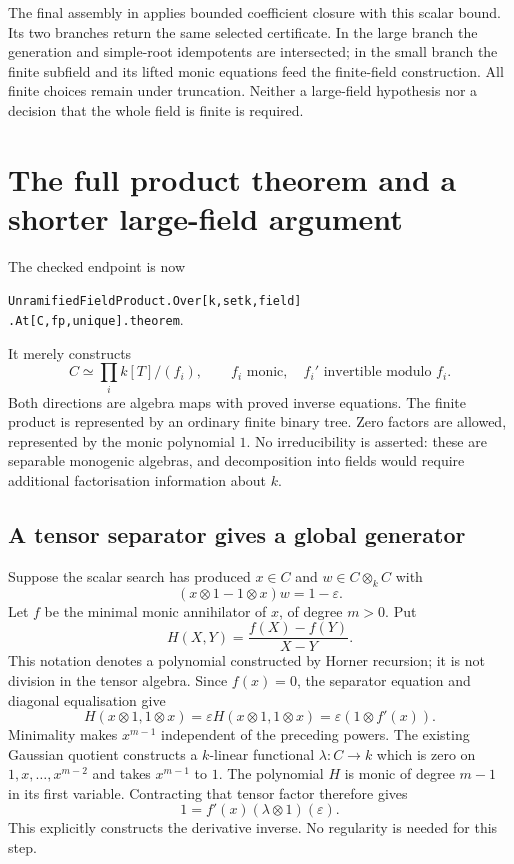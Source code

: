 \documentclass[11pt]{article}
\begin{document}
The final assembly in  applies
bounded coefficient closure with this scalar bound. Its two branches
return the same selected certificate. In the large branch the
generation and simple-root idempotents are intersected; in the small
branch the finite subfield and its lifted monic equations feed the
finite-field construction. All finite choices remain under truncation.
Neither a large-field hypothesis nor a decision that the whole field
is finite is required.

\section{The full product theorem and a shorter large-field argument}

The checked endpoint is now
\begin{center}
\texttt{UnramifiedFieldProduct.Over[k,setk,field]}\\
\texttt{.At[C,fp,unique].theorem}.
\end{center}
It merely constructs
\[
 C\simeq\prod_i k[T]/(f_i),
 \qquad f_i\text{ monic},\quad f_i'\text{ invertible modulo }f_i.
\]
Both directions are algebra maps with proved inverse equations.
The finite product is represented by an ordinary finite binary tree.
Zero factors are allowed, represented by the monic polynomial $1$.
No irreducibility is asserted: these are separable monogenic algebras,
and decomposition into fields would require additional factorisation
information about $k$.

\subsection{A tensor separator gives a global generator}

Suppose the scalar search has produced $x\in C$ and $w\in C\otimes_k C$
with
\[
 (x\otimes1-1\otimes x)w=1-\varepsilon.
\]
Let $f$ be the minimal monic annihilator of $x$, of degree $m>0$.
Put
\[
 H(X,Y)=\frac{f(X)-f(Y)}{X-Y}.
\]
This notation denotes a polynomial constructed by Horner recursion;
it is not division in the tensor algebra. Since $f(x)=0$, the separator
equation and diagonal equalisation give
\[
 H(x\otimes1,1\otimes x)
   =\varepsilon H(x\otimes1,1\otimes x)
   =\varepsilon(1\otimes f'(x)).
\]
Minimality makes $x^{m-1}$ independent of the preceding powers.
The existing Gaussian quotient constructs a $k$-linear functional
$\lambda:C\to k$ which is zero on $1,x,\ldots,x^{m-2}$ and takes
$x^{m-1}$ to $1$. The polynomial $H$ is monic of degree $m-1$ in its
first variable. Contracting that tensor factor therefore gives
\[
 1=f'(x)(\lambda\otimes1)(\varepsilon).
\]
This explicitly constructs the derivative inverse. No regularity is
needed for this step.
\end{document}
